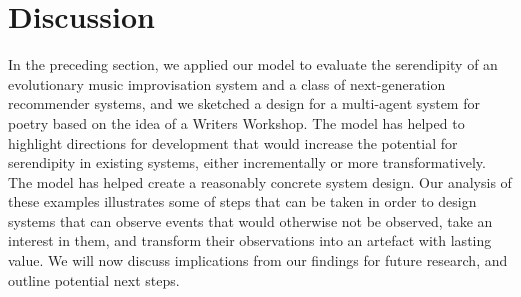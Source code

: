 
\section{Discussion} \label{sec:discussion}

In the preceding section, we applied our model to evaluate the serendipity of an evolutionary music improvisation system and a class of next-generation recommender systems, and we sketched a design for a multi-agent system for poetry based on the idea of a Writers Workshop.  The model has helped to highlight directions for development that would increase the potential for serendipity in existing systems, either incrementally or more transformatively.  The model has helped create a reasonably concrete system design.  Our analysis of these examples illustrates some of steps that can be taken in order to design systems that can observe events that would otherwise not be observed, take an interest in them, and transform their observations into an artefact with lasting value.  We will now discuss implications from our findings for future research, and outline potential next steps.





